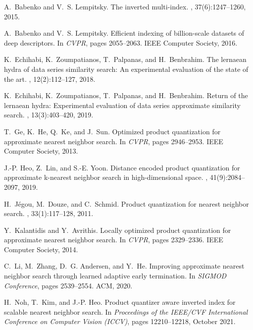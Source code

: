 \documentclass[11pt]{article}
\begin{document}
\begin{thebibliography}{10}
\begin{small}
A.~Babenko and V.~S. Lempitsky.
\newblock The inverted multi-index.
, 37(6):1247--1260,
2015.

A.~Babenko and V.~S. Lempitsky.
\newblock Efficient indexing of billion-scale datasets of deep descriptors.
\newblock In {\em {CVPR}}, pages 2055--2063. {IEEE} Computer Society, 2016.

K.~Echihabi, K.~Zoumpatianos, T.~Palpanas, and H.~Benbrahim.
\newblock The lernaean hydra of data series similarity search: An experimental
evaluation of the state of the art.
, 12(2):112--127, 2018.

K.~Echihabi, K.~Zoumpatianos, T.~Palpanas, and H.~Benbrahim.
\newblock Return of the lernaean hydra: Experimental evaluation of data series
approximate similarity search.
, 13(3):403--420, 2019.

T.~Ge, K.~He, Q.~Ke, and J.~Sun.
\newblock Optimized product quantization for approximate nearest neighbor
search.
\newblock In {\em {CVPR}}, pages 2946--2953. {IEEE} Computer Society, 2013.

J.-P. Heo, Z.~Lin, and S.-E. Yoon.
\newblock Distance encoded product quantization for approximate k-nearest
neighbor search in high-dimensional space.
,
41(9):2084--2097, 2019.

H.~J{\'{e}}gou, M.~Douze, and C.~Schmid.
\newblock Product quantization for nearest neighbor search.
, 33(1):117--128,
2011.

Y.~Kalantidis and Y.~Avrithis.
\newblock Locally optimized product quantization for approximate nearest
neighbor search.
\newblock In {\em {CVPR}}, pages 2329--2336. {IEEE} Computer Society, 2014.

C.~Li, M.~Zhang, D.~G. Andersen, and Y.~He.
\newblock Improving approximate nearest neighbor search through learned
adaptive early termination.
\newblock In {\em {SIGMOD} Conference}, pages 2539--2554. {ACM}, 2020.

H.~Noh, T.~Kim, and J.-P. Heo.
\newblock Product quantizer aware inverted index for scalable nearest neighbor
search.
\newblock In {\em Proceedings of the IEEE/CVF International Conference on
	Computer Vision (ICCV)}, pages 12210--12218, October 2021.


\end{small}
\end{thebibliography}
\end{document}
